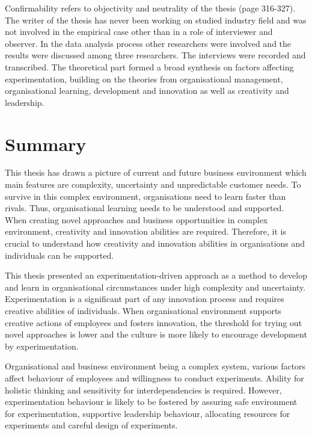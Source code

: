 Confirmability refers to objectivity and neutrality of the thesis \citep{lincoln1985naturalistic} (page 316-327). The writer of the thesis has never been working on studied industry field and was not involved in the empirical case other than in a role of interviewer and observer. In the data analysis process other researchers were involved and the results were discussed among three researchers. The interviews were recorded and transcribed. The theoretical part formed a broad synthesis on factors affecting experimentation, building on the theories from organisational management, organisational learning, development and innovation as well as creativity and leadership. 

\chapter{Summary}
This thesis has drawn a picture of current and future business environment which main features are complexity, uncertainty and unpredictable customer needs. To survive in this complex environment, organisations need to learn faster than rivals. Thus, organisational learning needs to be understood and supported. When creating novel approaches and business opportunities in complex environment, creativity and innovation abilities are required. Therefore, it is crucial to understand how creativity and innovation abilities in organisations and individuals can be supported. 

This thesis presented an experimentation-driven approach as a method to develop and learn in organisational circumstances under high complexity and uncertainty. Experimentation is a significant part of any innovation process and requires creative abilities of individuals. When organisational environment supports creative actions of employees and fosters innovation, the threshold for trying out novel approaches is lower and the culture is more likely to encourage development by experimentation. 

Organisational and business environment being a complex system, various factors affect behaviour of employees and willingness to conduct experiments. Ability for holistic thinking and sensitivity for interdependencies is required. However, experimentation behaviour is likely to be fostered by assuring safe environment for experimentation, supportive leadership behaviour, allocating resources for experiments and careful design of experiments. 


